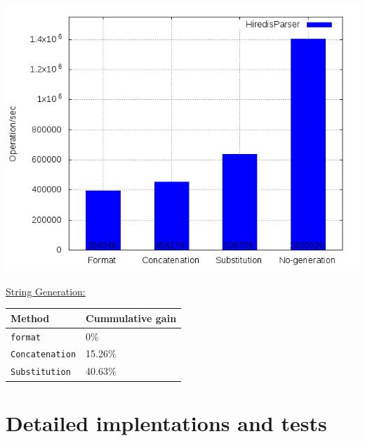 \documentclass[a4paper, 11pt]{report}
\begin{document}
\begin{minipage}{0.55\linewidth}
    \includegraphics[width=1.0\linewidth]{plots/pushing-proto-algo.png}
\end{minipage}
\begin{minipage}{0.4\linewidth}
    \underline{String Generation:}\\

    \begin{tabular}{|ll|}
        \hline
        Method & Cummulative gain\\
        \hline
        \texttt{format} & 0\%\\
        \texttt{Concatenation} & 15.26\%\\
        \texttt{Substitution} & 40.63\%\\
        \hline
    \end{tabular}
\end{minipage}


\chapter{Detailed implentations and tests}
\end{document}
